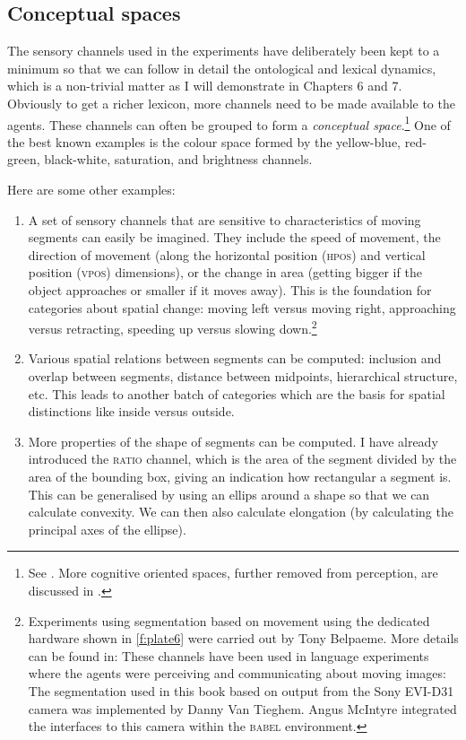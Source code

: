 \subsection{Conceptual spaces}

The sensory channels used in the experiments have
deliberately been kept to a minimum so that we can follow 
in detail the ontological and lexical dynamics, which is a 
non-trivial matter as I will demonstrate in Chapters 6 and 7.
Obviously to get a richer lexicon, more channels need to be made 
available to the agents. These channels can often be 
grouped to form a {\it conceptual space}.\footnote{See \cite{Gardenfors:1999}. 
More cognitive oriented spaces, further removed 
from perception, are discussed in \cite{Fauconnier:1994}.} One of the 
best known examples is the colour space formed by the
yellow-blue, red-green, black-white, saturation, and brightness channels. 

\clearpage
Here are some other examples: 
\begin{enumerate}
\item A set of sensory channels that are sensitive 
to characteristics of moving segments can easily be 
imagined. They include the speed
of movement, the direction of movement (along the 
horizontal position (\textsc{hpos}) and vertical position (\textsc{vpos}) 
dimensions), or the change in area (getting bigger if the object 
approaches or smaller if it moves away). This is the foundation
for categories about spatial change: moving left versus moving right,
approaching versus retracting, speeding up versus slowing down.\footnote{Experiments
using segmentation based on movement
using the dedicated hardware shown in \ref{f:plate6} were carried out by Tony Belpaeme. 
More details can be found in: \cite{Belpaeme:1998} These channels have been used in
language experiments where the agents were 
perceiving and communicating about moving 
images: \cite{Steels:1998}  
The segmentation used in this book 
based on output from the Sony EVI-D31 camera was 
implemented by Danny Van Tieghem. Angus McIntyre integrated
the interfaces to this camera within the \textsc{babel} environment. 
}

\item Various spatial relations between segments can be computed: 
inclusion and overlap between segments, distance between 
midpoints, hierarchical structure, etc. 
This leads to another batch of categories which are
the basis for spatial distinctions like inside versus outside. 

\item More properties of the shape of segments can be computed.
I have already introduced the \textsc{ratio} channel, which is the area of the 
segment divided by the area of the bounding box, giving an 
indication how rectangular a segment is. This can be generalised
by using an ellips around a shape so that we can calculate
convexity. We can then also calculate elongation (by calculating
the principal axes of the ellipse). 
\end{enumerate}

